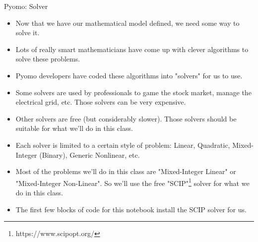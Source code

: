 \documentclass[10pt, aspectratio=169]{beamer}
\begin{document}
\begin{frame}{Pyomo: Solver}
    \begin{itemize}
        \item Now that we have our mathematical model defined, we need some way to solve it.
        \item Lots of really smart mathematicians have come up with clever algorithms to solve these problems.
        \item Pyomo developers have coded these algorithms into "solvers" for us to use.
        \item Some solvers are used by professionals to game the stock market, manage the electrical grid, etc. Those solvers can be very expensive.
        \item Other solvers are free (but considerably slower). Those solvers should be suitable for what we'll do in this class.
        \item Each solver is limited to a certain style of problem: Linear, Quadratic, Mixed-Integer (Binary), Generic Nonlinear, etc.
        \item Most of the problems we'll do in this class are "Mixed-Integer Linear" or "Mixed-Integer Non-Linear". So we'll use the free "SCIP"\footnote{https://www.scipopt.org/} solver for what we do in this class.
        \item The first few blocks of code for this notebook install the SCIP solver for us.
    \end{itemize}
\end{frame}
\end{document}
